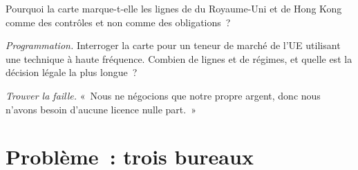 \begin{exercise}[$\star\star$]\label{exo:fm:regulators-and-licences:6}
Pourquoi la carte marque-t-elle les lignes de  du Royaume-Uni et de Hong Kong comme des contrôles et non comme des obligations~?
\end{exercise}

\begin{exercise}[$\star\star\star$]\label{exo:fm:regulators-and-licences:7}
\emph{Programmation.} Interroger la carte pour un teneur de marché de l'UE utilisant une technique à haute fréquence. Combien de lignes et de régimes, et quelle est la
décision légale la plus longue~?
\end{exercise}

\begin{exercise}[$\star\star\star$]\label{exo:fm:regulators-and-licences:8}
\emph{Trouver la faille.} «~Nous ne négocions que notre propre argent, donc nous n'avons besoin d'aucune licence nulle part.~»
\end{exercise}

\section{Problème~: trois bureaux}

